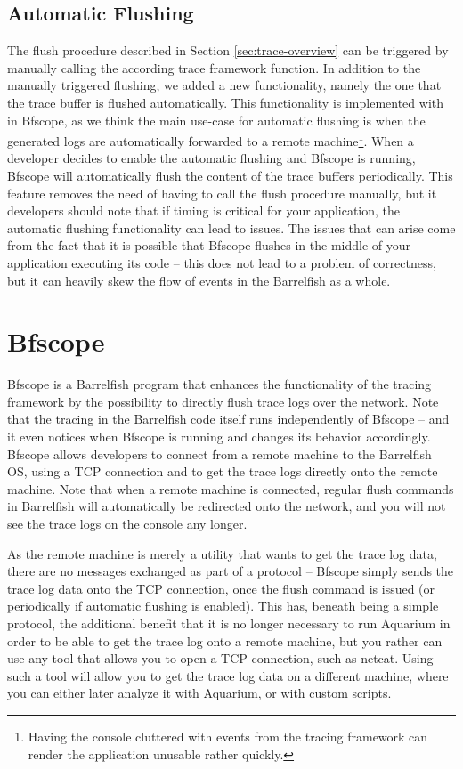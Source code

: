 \documentclass[a4paper,11pt,twoside]{report}
\begin{document}
\subsection{Automatic Flushing}

The flush procedure described in Section \ref{sec:trace-overview} can be
triggered by manually calling the according trace framework function. In
addition to the manually triggered flushing, we added a new functionality,
namely the one that the trace buffer is flushed automatically. This
functionality is implemented with in Bfscope, as we think the main use-case for
automatic flushing is when the generated logs are automatically forwarded to a
remote machine\footnote{Having the console cluttered with events from the
tracing framework can render the application unusable rather quickly.}. When a
developer decides to enable the automatic flushing and Bfscope is running,
Bfscope will automatically flush the content of the trace buffers periodically.
This feature removes the need of having to call the flush procedure manually,
but it developers should note that if timing is critical for your application,
the automatic flushing functionality can lead to issues. The issues that can
arise come from the fact that it is possible that Bfscope flushes in the middle
of your application executing its code -- this does not lead to a problem of
correctness, but it can heavily skew the flow of events in the Barrelfish as a
whole.

\section{Bfscope\label{sec:bfscope}}

Bfscope is a Barrelfish program that enhances the functionality of the tracing
framework by the possibility to directly flush trace logs over the network. Note
that the tracing in the Barrelfish code itself runs independently of Bfscope --
and it even notices when Bfscope is running and changes its behavior
accordingly. Bfscope allows developers to connect from a remote machine to the
Barrelfish OS, using a TCP connection and to get the trace logs directly onto
the remote machine. Note that when a remote machine is connected, regular flush
commands in Barrelfish will automatically be redirected onto the network, and
you will not see the trace logs on the console any longer.

As the remote machine is merely a utility that wants to get the trace log data,
there are no messages exchanged as part of a protocol -- Bfscope simply sends
the trace log data onto the TCP connection, once the flush command is issued (or
periodically if automatic flushing is enabled). This has, beneath being a simple
protocol, the additional benefit that it is no longer necessary to run Aquarium
in order to be able to get the trace log onto a remote machine, but you rather
can use any tool that allows you to open a TCP connection, such as netcat. Using
such a tool will allow you to get the trace log data on a different machine,
where you can either later analyze it with Aquarium, or with custom scripts.
\end{document}
